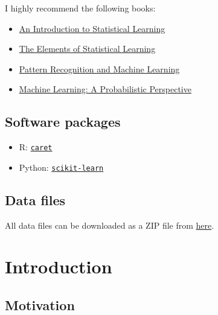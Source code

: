 \documentclass[]{book}
\providecommand{\tightlist}{%
  \setlength{\itemsep}{0pt}\setlength{\parskip}{0pt}}
\begin{document}
I highly recommend the following books:

\begin{itemize}
\tightlist
\item
  \href{http://www-bcf.usc.edu/~gareth/ISL/}{An Introduction to Statistical Learning}
\item
  \href{https://web.stanford.edu/~hastie/ElemStatLearn/}{The Elements of Statistical Learning}
\item
  \href{https://www.springer.com/gp/book/9780387310732}{Pattern Recognition and Machine Learning}
\item
  \href{https://www.cs.ubc.ca/~murphyk/MLbook/}{Machine Learning: A Probabilistic Perspective}
\end{itemize}

\hypertarget{software-packages}{%
\section*{Software packages}\label{software-packages}}

\begin{itemize}
\tightlist
\item
  R: \href{http://topepo.github.io/caret/index.html}{\texttt{caret}}
\item
  Python: \href{https://scikit-learn.org/stable/}{\texttt{scikit-learn}}
\end{itemize}

\hypertarget{data-files}{%
\section*{Data files}\label{data-files}}

All data files can be downloaded as a ZIP file from \href{https://exeter-data-analytics.github.io/StatModelling/dataFiles.zip}{here}.

\hypertarget{introduction}{%
\chapter{Introduction}\label{introduction}}

\hypertarget{motivation}{%
\section{Motivation}\label{motivation}}
\end{document}
